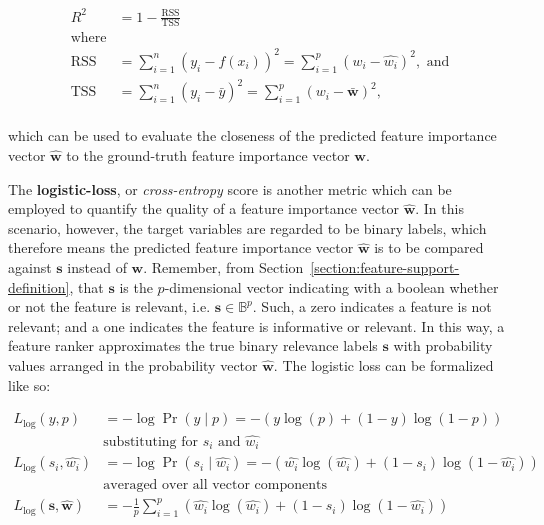 \documentclass[../main.tex]{subfiles}
\begin{document}
\begin{equation}
\begin{aligned}
R^{2}&=1-\frac{\mathrm{RSS}}{\mathrm{TSS}} \\
\text{where}&\\
\mathrm{RSS} &= \sum_{i=1}^{n}\left(y_{i}-f\left(x_{i}\right)\right)^{2} =\sum_{i=1}^{p}\left(w_i - \hat{w_i} \right)^{2}, \text{ and}\\
\mathrm{TSS} &= \sum_{i=1}^{n}\left(y_{i}-\bar{y}\right)^{2} =\sum_{i=1}^{p}\left( w_i - \bar{\boldsymbol{w}} \right)^{2}, \\
\end{aligned}
\end{equation}

which can be used to evaluate the closeness of the predicted feature importance vector $\hat{\boldsymbol{w}}$ to the ground-truth feature importance vector $\boldsymbol{w}$.

The \textbf{logistic-loss}, or \textit{cross-entropy} score is another metric which can be employed to quantify the quality of a feature importance vector $\hat{\boldsymbol{w}}$. In this scenario, however, the target variables are regarded to be binary labels, which therefore means the predicted feature importance vector $\hat{\boldsymbol{w}}$ is to be compared against $\boldsymbol{s}$ instead of $\boldsymbol{w}$. Remember, from Section~\ref{section:feature-support-definition}, that $\boldsymbol{s}$ is the $p$-dimensional vector indicating with a boolean whether or not the feature is relevant, i.e. $\boldsymbol{s} \in \mathbb{B}^p$. Such, a zero indicates a feature is not relevant; and a one indicates the feature is informative or relevant. In this way, a feature ranker approximates the true binary relevance labels $\boldsymbol{s}$ with probability values arranged in the probability vector $\hat{\boldsymbol{w}}$. The logistic loss can be formalized like so:

\begin{equation}
\begin{aligned}
L_{\log }(y, p) &= -\log \operatorname{Pr}(y \mid p)=-(y \log (p)+(1-y) \log (1-p)) \\
&\text{substituting for } s_i \text{ and } \hat{w_i}\\
L_{\log }(s_i, \hat{w_i}) &= -\log \operatorname{Pr}(s_i \mid \hat{w_i})= -(\hat{w_i} \log (\hat{w_i})+(1-s_i) \log (1-\hat{w_i})) \\
&\text{averaged over all vector components }\\
L_{\log }(\boldsymbol{s}, \hat{\boldsymbol{w}}) &= - \frac{1}{p} \sum_{i=1}^p (\hat{w_i} \log (\hat{w_i})+(1-s_i) \log (1-\hat{w_i})) \\
\end{aligned}
\end{equation}
\end{document}
